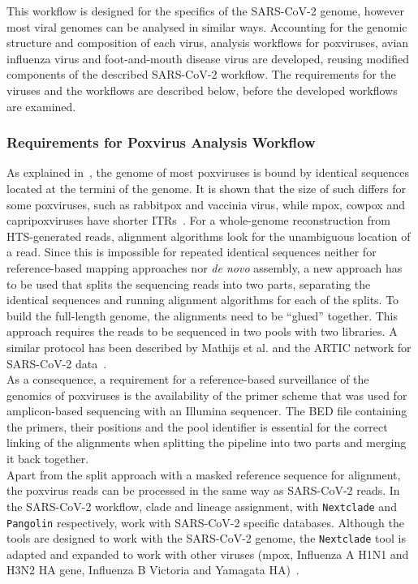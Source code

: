This workflow is designed for the specifics of the \ac{SARS-CoV-2} genome, however most viral genomes can be analysed in similar ways. Accounting for the genomic structure and composition of each virus, analysis workflows for poxviruses, avian influenza virus and foot-and-mouth disease virus are developed, reusing modified components of the described \ac{SARS-CoV-2} workflow. The requirements for the viruses and the workflows are described below, before the developed workflows are examined. %

\subsubsection{Requirements for Poxvirus Analysis Workflow}
As explained in~, the genome of most poxviruses is bound by identical sequences located at the termini of the genome. It is shown that the size of such differs for some poxviruses, such as rabbitpox and vaccinia virus, while mpox, cowpox and capripoxviruses have shorter \acp{ITR}~\cite{wittek1978inverted}. For a whole-genome reconstruction from \ac{HTS}-generated reads, alignment algorithms look for the unambiguous location of a read. Since this is impossible for repeated identical sequences neither for reference-based mapping approaches nor \textit{de novo} assembly, a new approach has to be used that splits the sequencing reads into two parts, separating the identical sequences and running alignment algorithms for each of the splits. To build the full-length genome, the alignments need to be ``glued'' together. This approach requires the reads to be sequenced in two pools with two libraries. A similar protocol has been described by Mathijs et al. and the ARTIC network for \ac{SARS-CoV-2} data~\cite{mathijs2022robust, tyson2020improvements}. \\
As a consequence, a requirement for a reference-based surveillance of the genomics of poxviruses is the availability of the primer scheme that was used for amplicon-based sequencing with an Illumina sequencer. The \ac{BED} file containing the primers, their positions and the pool identifier is essential for the correct linking of the alignments when splitting the pipeline into two parts and merging it back together. \\
Apart from the split approach with a masked reference sequence for alignment, the poxvirus reads can be processed in the same way as \ac{SARS-CoV-2} reads. In the \ac{SARS-CoV-2} workflow, clade and lineage assignment, with \texttt{Nextclade} and \texttt{Pangolin} respectively, work with \ac{SARS-CoV-2} specific databases. Although the tools are designed to work with the \ac{SARS-CoV-2} genome, the \texttt{Nextclade} tool is adapted and expanded to work with other viruses (mpox, Influenza A H1N1 and H3N2 HA gene, Influenza B Victoria and Yamagata HA)~\cite{aksamentov2021nextclade}.

